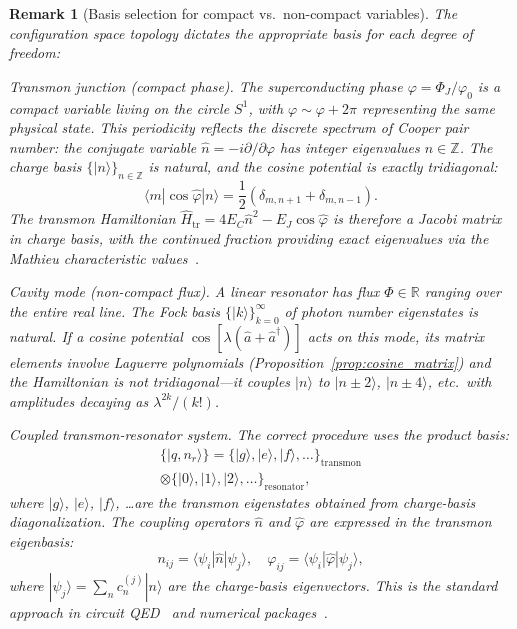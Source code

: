 \documentclass[reprint, floatfix, superscriptaddress, amsmath, amssymb, longbibliography]{revtex4-2}
\newtheorem{remark}[theorem]{Remark}
\begin{document}
\begin{remark}[Basis selection for compact vs.\ non-compact variables]
\label{remark:basis_selection}
The configuration space topology dictates the appropriate basis for each degree of freedom:

\textit{Transmon junction (compact phase).} The superconducting phase $\varphi = \Phi_J/\varphi_0$ is a compact variable living on the circle $S^1$, with $\varphi \sim \varphi + 2\pi$ representing the same physical state. This periodicity reflects the discrete spectrum of Cooper pair number: the conjugate variable $\hat{n} = -i\partial/\partial\varphi$ has integer eigenvalues $n \in \mathbb{Z}$. The charge basis $\{|n\rangle\}_{n \in \mathbb{Z}}$ is natural, and the cosine potential is exactly tridiagonal:
\begin{equation}
\langle m | \cos\hat{\varphi} | n \rangle = \frac{1}{2}(\delta_{m,n+1} + \delta_{m,n-1}).
\label{eq:cosine_charge_tridiag}
\end{equation}
The transmon Hamiltonian $\hat{H}_{\mathrm{tr}} = 4E_C \hat{n}^2 - E_J \cos\hat{\varphi}$ is therefore a Jacobi matrix in charge basis, with the continued fraction providing exact eigenvalues via the Mathieu characteristic values~\cite{Koch2007}.

\textit{Cavity mode (non-compact flux).} A linear resonator has flux $\Phi \in \mathbb{R}$ ranging over the entire real line. The Fock basis $\{|k\rangle\}_{k=0}^\infty$ of photon number eigenstates is natural. If a cosine potential $\cos[\lambda(\hat{a}+\hat{a}^\dagger)]$ acts on this mode, its matrix elements involve Laguerre polynomials (Proposition~\ref{prop:cosine_matrix}) and the Hamiltonian is not tridiagonal---it couples $|n\rangle$ to $|n \pm 2\rangle$, $|n \pm 4\rangle$, etc.\ with amplitudes decaying as $\lambda^{2k}/(k!)$.

\textit{Coupled transmon-resonator system.} The correct procedure uses the product basis:
\begin{multline}
\{|q, n_r\rangle\} = \{|g\rangle, |e\rangle, |f\rangle, \ldots\}_{\mathrm{transmon}} \\
\otimes \{|0\rangle, |1\rangle, |2\rangle, \ldots\}_{\mathrm{resonator}},
\end{multline}
where $|g\rangle$, $|e\rangle$, $|f\rangle$, \ldots are the transmon eigenstates obtained from charge-basis diagonalization. The coupling operators $\hat{n}$ and $\hat{\varphi}$ are expressed in the transmon eigenbasis:
\begin{equation}
n_{ij} = \langle \psi_i | \hat{n} | \psi_j \rangle, \quad \varphi_{ij} = \langle \psi_i | \hat{\varphi} | \psi_j \rangle,
\end{equation}
where $|\psi_j\rangle = \sum_n c_n^{(j)} |n\rangle$ are the charge-basis eigenvectors. This is the standard approach in circuit QED~\cite{Koch2007, Blais2021} and numerical packages~\cite{Groszkowski2021}.
\end{remark}
\end{document}
